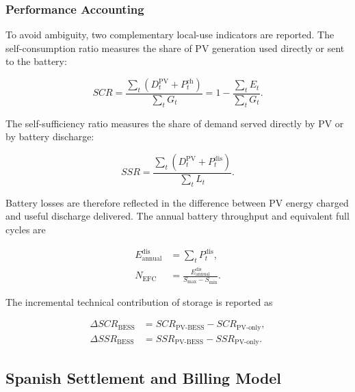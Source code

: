 \subsubsection{Performance Accounting}
\label{subsec:annual_accounting}

To avoid ambiguity, two complementary local-use indicators are reported. The self-consumption ratio measures the share of PV generation used directly or sent to the battery:

\begin{equation}
\label{eq:scr_general}
SCR=\frac{\sum_t\left(D^{\mathrm{PV}}_t+P^{\mathrm{ch}}_t\right)}{\sum_t G_t}
=1-\frac{\sum_t E_t}{\sum_tG_t}.
\end{equation}

The self-sufficiency ratio measures the share of demand served directly by PV or by battery discharge:

\begin{equation}
\label{eq:ssr_general}
SSR=\frac{\sum_t\left(D^{\mathrm{PV}}_t+P^{\mathrm{dis}}_t\right)}{\sum_t L_t}.
\end{equation}

Battery losses are therefore reflected in the difference between PV energy charged and useful discharge delivered. The annual battery throughput and equivalent full cycles are

\begin{align}
E^{\mathrm{dis}}_{\mathrm{annual}} &= \sum_tP^{\mathrm{dis}}_t,\label{eq:annual_discharge}\\
N_{\mathrm{EFC}} &= \frac{E^{\mathrm{dis}}_{\mathrm{annual}}}{S_{\max}-S_{\min}}.\label{eq:equivalent_full_cycles}
\end{align}

The incremental technical contribution of storage is reported as

\begin{align}
\Delta SCR_{\mathrm{BESS}} &= SCR_{\mathrm{PV\mbox{-}BESS}}-SCR_{\mathrm{PV\mbox{-}only}},\label{eq:delta_scr_bess}\\
\Delta SSR_{\mathrm{BESS}} &= SSR_{\mathrm{PV\mbox{-}BESS}}-SSR_{\mathrm{PV\mbox{-}only}}.\label{eq:delta_ssr_bess}
\end{align}

\subsection{Spanish Settlement and Billing Model}
\label{sec:spanish_settlement_billing_model}

